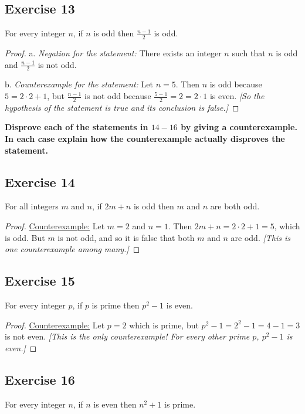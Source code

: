 \documentclass[14pt]{extarticle}
\newcommand{\cy}{\color{cyan}}
\begin{document}
\subsection{Exercise 13}
For every integer $n$, if $n$ is odd then $\frac{n-1}{2}$ is odd.

\begin{proof}
a. {\it Negation for the statement:} There exists an integer $n$ such that $n$ is odd and $\frac{n-1}{2}$ is not odd.

b. {\it Counterexample for the statement:} Let $n = 5$. Then $n$ is odd because $5 = 2 \cdot 2 + 1$, but $\frac{n-1}{2}$ is not odd because $\frac{5-1}{2} = 2 = 2 \cdot 1$ is even. {\it [So the hypothesis of the statement is true and its conclusion is false.]}
\end{proof}

{\bf \cy Disprove each of the statements in $14-16$ by giving a counterexample. In each case explain how the counterexample actually disproves the statement.}

\subsection{Exercise 14}
For all integers $m$ and $n$, if $2m + n$ is odd then $m$ and $n$ are both odd.

\begin{proof}
\underline{Counterexample:} Let $m = 2$ and $n = 1$. Then $2m + n = 2 \cdot 2 + 1 = 5$, which is odd. But $m$ is not odd, and so it is false that both $m$ and $n$ are odd. {\it [This is one counterexample among many.]}
\end{proof}

\subsection{Exercise 15}
For every integer $p$, if $p$ is prime then $p^2 - 1$ is even.

\begin{proof}
\underline{Counterexample:} Let $p = 2$ which is prime, but $p^2 - 1 = 2^2 - 1 = 4 - 1 = 3$ is not even. {\it [This is the only counterexample! For every other prime $p$, $p^2 - 1$ is even.]}
\end{proof}

\subsection{Exercise 16}
For every integer $n$, if $n$ is even then $n^2 + 1$ is prime.
\end{document}
